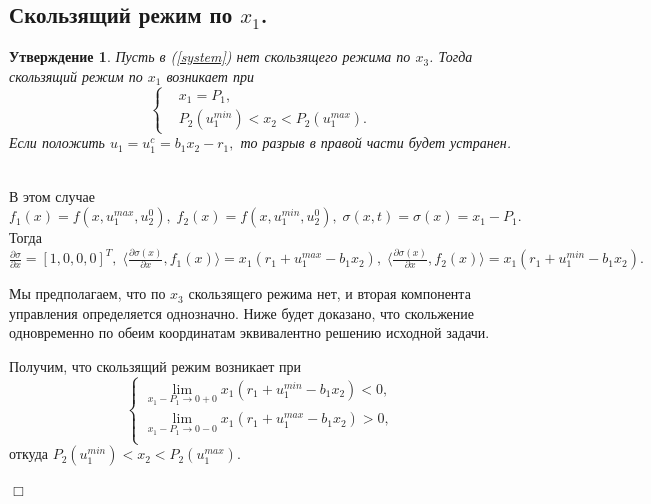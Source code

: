 \documentclass[11pt]{article}
\newtheorem{statement}{Утверждение}
\theoremstyle{definition}
\newenvironment{Proof}
{\par\noindent{\bf Доказательство.\\}} 
{\begin{flushright}$\Box$\end{flushright}}
\newcommand\Ref[1]{(\ref{#1})}
\newcommand\RS{\Ref{system} }
\newcommand\dd[2]{\frac{\partial#1}{\partial#2}}
\begin{document}
\subsection{Скользящий режим по $x_1$.}
\begin{statement}
	Пусть в \RS нет скользящего режима по $x_3$. Тогда скользящий режим по $x_1$ возникает при 
	$$
        	\left\{
        \begin{aligned}
        		&x_1 = P_1, \\
        		&P_2(u_1^{min}) < x_2 < P_2(u_1^{max}).
        \end{aligned}
        \right.
	$$
	Если положить $u_1 = u_1^c = b_1x_2 - r_1,$ то разрыв в правой части будет устранен.
\end{statement}
\begin{Proof}\\
    \indent В этом случае 
    $f_1(x) = f(x, u_1^{max}, u_2^0), \; f_2(x) = f(x, u_1^{min}, u_2^0), \; \sigma(x,t) = \sigma(x) = x_1 - P_1.$
    Тогда $\dd{\sigma}{x} = [1,0,0,0]^T, \; \langle \dd{\sigma(x)}{x}, f_1(x) \rangle = x_1(r_1 + u_1^{max}  - b_1x_2), \; \langle \dd{\sigma(x)}{x}, f_2(x) \rangle = x_1(r_1 + u_1^{min}  - b_1x_2).$
    
    Мы предполагаем, что по $x_3$ скользящего режима нет, и вторая компонента управления определяется однозначно. Ниже будет доказано, что скольжение одновременно по обеим координатам эквивалентно решению исходной задачи.
    
    Получим, что скользящий режим возникает при 
    $$
    \left\{
    \begin{aligned}
    	\lim_{x_1 - P_1 \to 0 + 0} x_1(r_1 + u_1^{min} - b_1x_2) < 0, \\
    	\lim_{x_1 - P_1 \to 0 - 0} x_1(r_1 + u_1^{max} - b_1x_2) > 0, \\
    \end{aligned}
    \right.
    $$
    откуда $P_2(u_1^{min}) < x_2 < P_2(u_1^{max}).$
    

\end{Proof}
\end{document}
